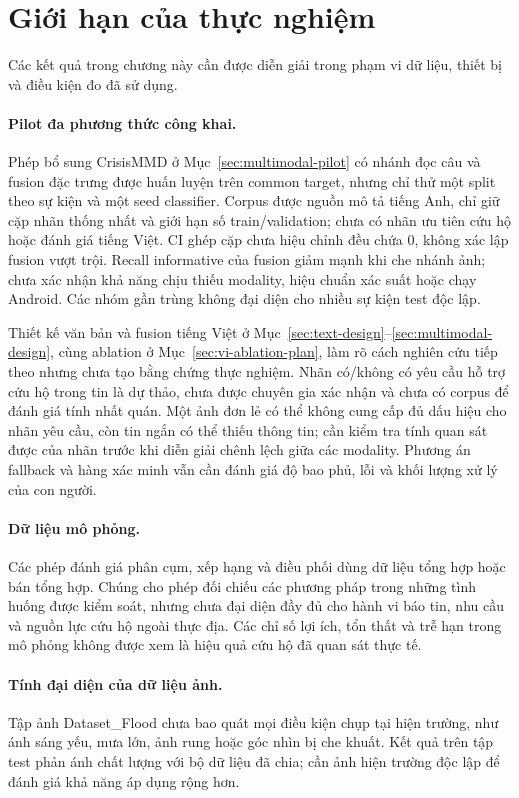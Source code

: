 \section{Giới hạn của thực nghiệm}\label{sec:04-evaluation-limitations}
Các kết quả trong chương này cần được diễn giải trong phạm vi dữ liệu, thiết bị và điều kiện đo đã sử dụng.

\paragraph{Pilot đa phương thức công khai.}
Phép bổ sung CrisisMMD ở Mục~\ref{sec:multimodal-pilot} có nhánh đọc câu và fusion đặc trưng được huấn luyện trên common target, nhưng chỉ thử một split theo sự kiện và một seed classifier. Corpus được nguồn mô tả tiếng Anh, chỉ giữ cặp nhãn thống nhất và giới hạn số train/validation; chưa có nhãn ưu tiên cứu hộ hoặc đánh giá tiếng Việt. CI ghép cặp chưa hiệu chỉnh đều chứa 0, không xác lập fusion vượt trội. Recall informative của fusion giảm mạnh khi che nhánh ảnh; chưa xác nhận khả năng chịu thiếu modality, hiệu chuẩn xác suất hoặc chạy Android. Các nhóm gần trùng không đại diện cho nhiều sự kiện test độc lập.

Thiết kế văn bản và fusion tiếng Việt ở Mục~\ref{sec:text-design}--\ref{sec:multimodal-design}, cùng ablation ở Mục~\ref{sec:vi-ablation-plan}, làm rõ cách nghiên cứu tiếp theo nhưng chưa tạo bằng chứng thực nghiệm. Nhãn có/không có yêu cầu hỗ trợ cứu hộ trong tin là dự thảo, chưa được chuyên gia xác nhận và chưa có corpus để đánh giá tính nhất quán. Một ảnh đơn lẻ có thể không cung cấp đủ dấu hiệu cho nhãn yêu cầu, còn tin ngắn có thể thiếu thông tin; cần kiểm tra tính quan sát được của nhãn trước khi diễn giải chênh lệch giữa các modality. Phương án fallback và hàng xác minh vẫn cần đánh giá độ bao phủ, lỗi và khối lượng xử lý của con người.

\paragraph{Dữ liệu mô phỏng.}
Các phép đánh giá phân cụm, xếp hạng và điều phối dùng dữ liệu tổng hợp hoặc bán tổng hợp. Chúng cho phép đối chiếu các phương pháp trong những tình huống được kiểm soát, nhưng chưa đại diện đầy đủ cho hành vi báo tin, nhu cầu và nguồn lực cứu hộ ngoài thực địa. Các chỉ số lợi ích, tổn thất và trễ hạn trong mô phỏng không được xem là hiệu quả cứu hộ đã quan sát thực tế.

\paragraph{Tính đại diện của dữ liệu ảnh.}
Tập ảnh Dataset\_Flood chưa bao quát mọi điều kiện chụp tại hiện trường, như ánh sáng yếu, mưa lớn, ảnh rung hoặc góc nhìn bị che khuất. Kết quả trên tập test phản ánh chất lượng với bộ dữ liệu đã chia; cần ảnh hiện trường độc lập để đánh giá khả năng áp dụng rộng hơn.

